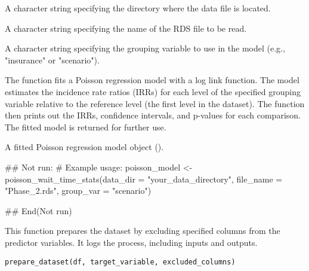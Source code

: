 \documentclass[a4paper]{book}
\begin{document}
%
\begin{Arguments}
\begin{ldescription}
\item[\code{data\_dir}] A character string specifying the directory where the data file is located.

\item[\code{file\_name}] A character string specifying the name of the RDS file to be read.

\item[\code{group\_var}] A character string specifying the grouping variable to use in the model (e.g., "insurance" or "scenario").
\end{ldescription}
\end{Arguments}
%
\begin{Details}
The function fits a Poisson regression model with a log link function.
The model estimates the incidence rate ratios (IRRs) for each level of the specified grouping variable
relative to the reference level (the first level in the dataset). The function then prints out the IRRs,
confidence intervals, and p-values for each comparison. The fitted model is returned for further use.
\end{Details}
%
\begin{Value}
A fitted Poisson regression model object ().
\end{Value}
%
\begin{Examples}
\begin{ExampleCode}
## Not run: 
# Example usage:
poisson_model <- poisson_wait_time_stats(data_dir = "your_data_directory",
                                         file_name = "Phase_2.rds",
                                         group_var = "scenario")

## End(Not run)

\end{ExampleCode}
\end{Examples}
%
\begin{Description}
This function prepares the dataset by excluding specified columns from the predictor variables.
It logs the process, including inputs and outputs.
\end{Description}
%
\begin{Usage}
\begin{verbatim}
prepare_dataset(df, target_variable, excluded_columns)
\end{verbatim}
\end{Usage}
\end{document}
